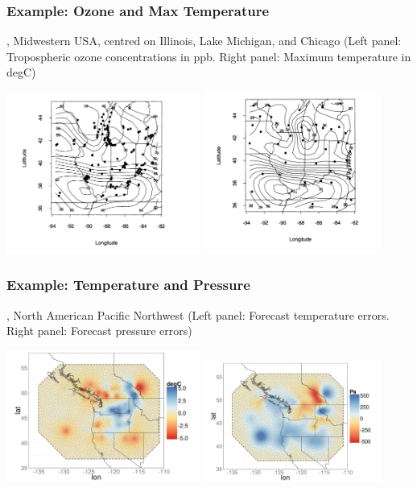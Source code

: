 \documentclass{beamer}
\begin{document}
\begin{frame}
\frametitle{Example: Ozone and Max Temperature}

\cite{RoyleBerliner1999}, Midwestern USA, centred on Illinois, Lake Michigan, and Chicago (Left panel: Tropospheric ozone concentrations in ppb. Right panel: Maximum temperature in degC)

\begin{center}
\includegraphics[width=2.5in]{./ozone.png}
\includegraphics[width=2.3in]{./maxt.png}
\end{center}
\end{frame}

\begin{frame}
\frametitle{Example: Temperature and Pressure}
\cite{Gneitingetal2010}, North American Pacific Northwest (Left panel: Forecast temperature errors. Right panel: Forecast pressure errors)

\begin{center}
\includegraphics[width=2.5in]{./Temp.png}
\includegraphics[width=2.3in]{./Pressure.png}
\end{center}
\end{frame}
\end{document}
